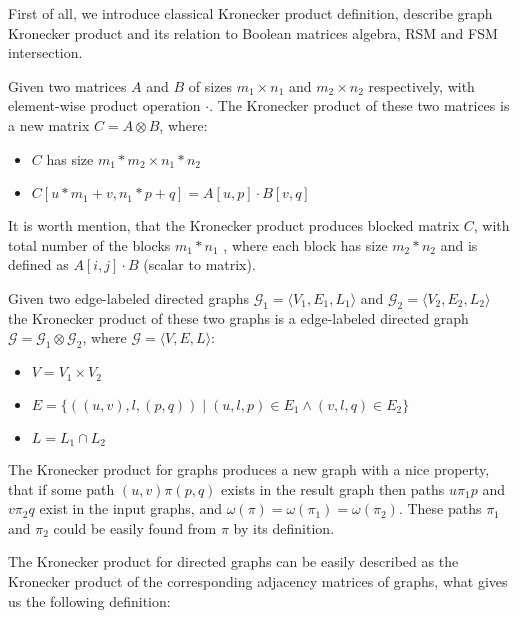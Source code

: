 First of all, we introduce classical Kronecker product definition, describe graph Kronecker product and its relation to Boolean matrices algebra, RSM and FSM intersection.

\begin{definition}
Given two matrices $A$ and $B$ of sizes $m_1 \times n_1$ and $m_2 \times n_2$ respectively, with element-wise product operation $\cdot$. The Kronecker product of these two matrices is a new matrix $C = A \otimes B$, where: 
 \begin{itemize}
     \item $C$ has size $m_1 * m_2 \times n_1 * n_2$
     \item $C[u * m_1 + v,n_1 * p + q] = A[u,p] \cdot B[v,q]$
 \end{itemize}
\end{definition}

It is worth mention, that the Kronecker product produces blocked matrix $C$, with total number of the blocks $m_1 * n_1$ , where each block has size $m_2 * n_2$ and is defined as $A[i,j] \cdot B$ (scalar to matrix).

\begin{definition}
\label{def:graph:product}
Given two edge-labeled directed graphs $\mathcal{G}_1=\langle V_1, E_1, L_1 \rangle$ and $\mathcal{G}_2=\langle V_2, E_2, L_2 \rangle$ the Kronecker product of these two graphs is a edge-labeled directed graph $\mathcal{G}=\mathcal{G}_1 \otimes \mathcal{G}_2$, where $\mathcal{G}= \langle V, E, L \rangle$:
\begin{itemize}
    \item $V = V_1 \times V_2$
    \item $E = \{((u,v),l,(p,q)) \mid (u,l,p) \in E_1 \wedge (v,l,q) \in E_2 \}$
    \item $L = L_1 \cap L_2$
\end{itemize}
\end{definition}

The Kronecker product for graphs produces a new graph with a nice property, that if some path $(u,v)\pi(p,q)$ exists in the result graph then paths $u\pi_1p$ and $v\pi_2q$ exist in the input graphs, and $\omega(\pi) = \omega(\pi_1) = \omega(\pi_2)$. These paths $\pi_1$ and $\pi_2$ could be easily found from $\pi$ by its definition.

The Kronecker product for directed graphs can be easily described as the Kronecker product of the corresponding adjacency matrices of graphs, what gives us the following definition:

